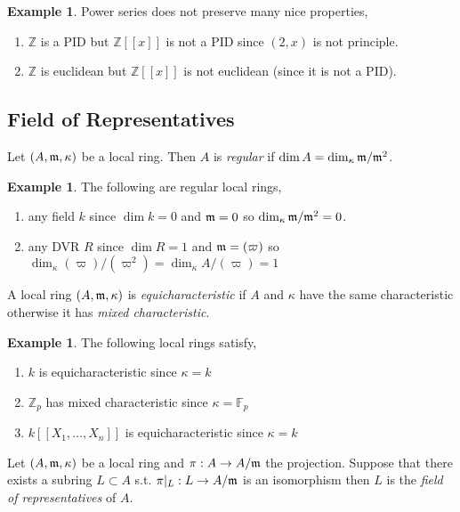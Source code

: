 \documentclass[12pt]{extarticle}
\newcommand{\Z}{\mathbb{Z}}
\theoremstyle{definition}
\newtheorem{example}[theorem]{Example}
\newenvironment{definition}[1][Definition:]{\begin{trivlist}
\item[\hskip \labelsep {\bfseries #1}]}{\end{trivlist}}
\begin{document}
\begin{example}
Power series does not preserve many nice properties,
\begin{enumerate}
\item $\Z$ is a PID but $\Z[[x]]$ is not a PID since $(2, x)$ is not principle.
\item $\Z$ is euclidean but $\Z[[x]]$ is not euclidean (since it is not a PID).
\end{enumerate}
\end{example}

\subsection{Field of Representatives}

\begin{definition}
Let $(A, \mathfrak{m}, \kappa)$ be a local ring. Then $A$ is \textit{regular} if $\dim{A} = \dim_{\kappa} \mathfrak{m} / \mathfrak{m}^2$. 
\end{definition}

\begin{example}
The following are regular local rings,
\begin{enumerate}
\item any field $k$ since $\dim{k} = 0$ and $\mathfrak{m} = 0$ so $\dim_{\kappa} \mathfrak{m} / \mathfrak{m}^2 = 0$.
\item any DVR $R$ since $\dim{R} = 1$ and $\mathfrak{m} = (\varpi)$ so $\dim_{\kappa} (\varpi) / (\varpi^2) = \dim_{\kappa} A / (\varpi) = 1$
\end{enumerate}
\end{example}

\begin{definition}
A local ring $(A, \mathfrak{m}, \kappa)$ is \textit{equicharacteristic} if $A$ and $\kappa$ have the same characteristic otherwise it has \textit{mixed characteristic}.
\end{definition}

\begin{example}
The following local rings satisfy,
\begin{enumerate}
\item $k$ is equicharacteristic since $\kappa = k$
\item $\Z_p$ has mixed characteristic since $\kappa = \mathbb{F}_p$
\item $k[[X_1, \dots, X_n]]$ is equicharacteristic since $\kappa = k$
\end{enumerate}
\end{example}

\begin{definition}
Let $(A, \mathfrak{m}, \kappa)$ be a local ring and $\pi : A \to A / \mathfrak{m}$ the projection. Suppose that there exists a subring $L \subset A$ s.t. $\pi|_L : L \to A / \mathfrak{m}$ is an isomorphism then $L$ is the \textit{field of representatives} of $A$. 
\end{definition}
\end{document}
